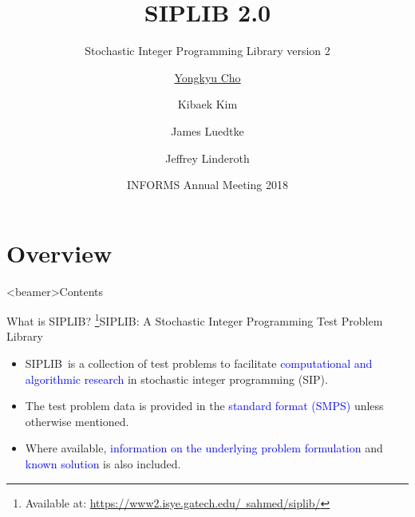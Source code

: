 \documentclass[usenames,dvipsnames]{beamer}
\title{\textbf{SIPLIB 2.0}}
\subtitle{Stochastic Integer Programming Library version 2}
\author{\underline{Yongkyu Cho}\inst{1}\inst{2} \and Kibaek Kim\inst{2} \\ \and James Luedtke\inst{3} \and Jeffrey Linderoth\inst{3}}
\institute[] %
{
	\inst{1}%
	Department of Industrial and Management Engineering\\
	Pohang University of Science and Technology
	\and
	\inst{2}%
	Mathematics and Computer Science Division\\
	Argonne National Laboratory
	\and
	\inst{3}%
	Department of Industrial and Systems Engineering\\
	University of Wisconsin-Madison
}
\date{INFORMS Annual Meeting 2018}
\newcommand{\siplib}{\textsf{SIPLIB}}
\newcommand{\smps}{\textsf{SMPS}}
\begin{document}
	
	
	\begin{frame}
	\titlepage
\end{frame}


\section{Overview}
\begin{frame}<beamer>{Contents}
\end{frame}	

\begin{frame}{What is \siplib?}
\footnote{\tiny Available at: \href{https://www2.isye.gatech.edu/~sahmed/siplib/}{https://www2.isye.gatech.edu/~sahmed/siplib/}}{\siplib}: A Stochastic Integer Programming Test Problem Library
\begin{itemize}
\item \siplib\ is a collection of test problems to facilitate \textcolor{blue}{computational and algorithmic research} in stochastic integer programming (SIP).
\item The test problem data is provided in the \textcolor{blue}{standard format (\smps)} unless otherwise mentioned.
\item Where available, \textcolor{blue}{information on the underlying problem formulation} and \textcolor{blue}{known solution} is also included.
\end{itemize}
\end{frame}
\end{document}
